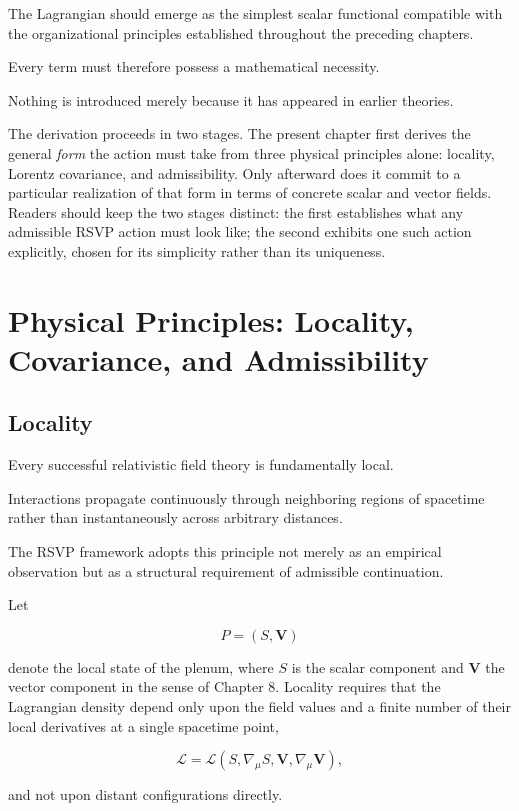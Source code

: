 \documentclass[11pt,oneside]{book}
\numberwithin{equation}{chapter}
\theoremstyle{definition}
\theoremstyle{plain}
\begin{document}
The Lagrangian should emerge as the simplest scalar functional compatible
with the organizational principles established throughout the preceding
chapters.

Every term must therefore possess a mathematical necessity.

Nothing is introduced merely because it has appeared in earlier theories.

The derivation proceeds in two stages. The present chapter first derives the
general \emph{form} the action must take from three physical principles
alone: locality, Lorentz covariance, and admissibility. Only afterward does
it commit to a particular realization of that form in terms of concrete
scalar and vector fields. Readers should keep the two stages distinct: the
first establishes what any admissible RSVP action must look like; the second
exhibits one such action explicitly, chosen for its simplicity rather than
its uniqueness.

\section{Physical Principles: Locality, Covariance, and Admissibility}

\subsection*{Locality}

Every successful relativistic field theory is fundamentally local.

Interactions propagate continuously through neighboring regions of
spacetime rather than instantaneously across arbitrary distances.

The RSVP framework adopts this principle not merely as an empirical
observation but as a structural requirement of admissible continuation.

Let

\[
P=(S,\mathbf V)
\]

denote the local state of the plenum, where \(S\) is the scalar component
and \(\mathbf V\) the vector component in the sense of Chapter 8. Locality
requires that the Lagrangian density depend only upon the field values and a
finite number of their local derivatives at a single spacetime point,

\[
\mathcal L
=
\mathcal L
\!\left(
S,
\nabla_\mu S,
\mathbf V,
\nabla_\mu\mathbf V
\right),
\]

and not upon distant configurations directly.
\end{document}

